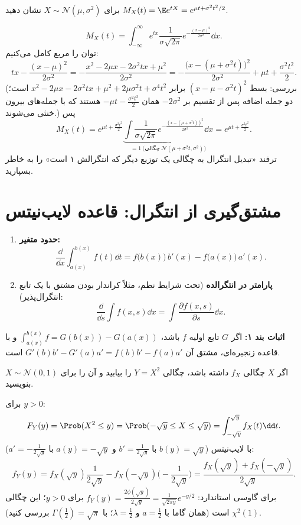 \begin{example}
برای $X\sim\mathcal N(\mu,\sigma^2)$ نشان دهید $M_X(t)=\E e^{tX}=e^{\mu t+\sigma^2t^2/2}$.
\begin{solution}
\[
M_X(t)=\int_{-\infty}^\infty e^{tx}\frac{1}{\sigma\sqrt{2\pi}}e^{-\frac{(x-\mu)^2}{2\sigma^2}}\dd x .
\]
توان را مربع کامل می‌کنیم:
\[
tx-\frac{(x-\mu)^2}{2\sigma^2}=-\frac{x^2-2\mu x-2\sigma^2tx+\mu^2}{2\sigma^2}=-\frac{\big(x-(\mu+\sigma^2t)\big)^2}{2\sigma^2}+\mu t+\frac{\sigma^2t^2}{2}.
\]
(بررسی: بسط $(x-\mu-\sigma^2t)^2$ برابر $x^2-2\mu x-2\sigma^2tx+\mu^2+2\mu\sigma^2t+\sigma^4t^2$ است؛ دو جمله اضافه پس از تقسیم بر $-2\sigma^2$ همان $-\mu t-\frac{\sigma^2t^2}{2}$ هستند که با جمله‌های بیرون خنثی می‌شوند.) پس
\[
M_X(t)=e^{\mu t+\frac{\sigma^2t^2}{2}}\underbrace{\int\frac{1}{\sigma\sqrt{2\pi}}e^{-\frac{(x-(\mu+\sigma^2t))^2}{2\sigma^2}}\dd x}_{=1\ \text{(چگالی}\ \mathcal N(\mu+\sigma^2t,\sigma^2))}=e^{\mu t+\frac{\sigma^2t^2}{2}} .
\]
ترفند «تبدیل انتگرال به چگالی یک توزیع دیگر که انتگرالش ۱ است» را به خاطر بسپارید.
\end{solution}
\end{example}

\section{مشتق‌گیری از انتگرال: قاعده لایب‌نیتس}

\begin{theorem}
\begin{enumerate}
\item \textbf{حدود متغیر:}
\[
\frac{\dd}{\dd x}\int_{a(x)}^{b(x)}f(t)\dd t=f\big(b(x)\big)\,b'(x)-f\big(a(x)\big)\,a'(x).
\]
\item \textbf{پارامتر در انتگرالده} (تحت شرایط نظم، مثلاً کراندار بودن مشتق با یک تابع انتگرال‌پذیر):
\[
\frac{\dd}{\dd s}\int f(x,s)\dd x=\int\frac{\partial f(x,s)}{\partial s}\dd x .
\]
\end{enumerate}
\end{theorem}
\textbf{اثبات بند ۱:} اگر $G$ تابع اولیه $f$ باشد، $\int_{a(x)}^{b(x)}f=G(b(x))-G(a(x))$ و با قاعده زنجیره‌ای، مشتق آن $G'(b)b'-G'(a)a'=f(b)b'-f(a)a'$ است.

\begin{example}[چگالی $Y=X^2$ و توزیع $\chi^2$ با یک درجه آزادی]
اگر $X$ چگالی $f_X$ داشته باشد، چگالی $Y=X^2$ را بیابید و آن را برای $X\sim\mathcal N(0,1)$ بنویسید.
\begin{solution}
برای $y>0$:
\[
F_Y(y)=\Prob(X^2\le y)=\Prob(-\sqrt y\le X\le\sqrt y)=\int_{-\sqrt y}^{\sqrt y}f_X(t)\dd t .
\]
با لایب‌نیتس ($b(y)=\sqrt y$ با $b'=\frac{1}{2\sqrt y}$ و $a(y)=-\sqrt y$ با $a'=-\frac{1}{2\sqrt y}$):
\[
f_Y(y)=f_X(\sqrt y)\frac{1}{2\sqrt y}-f_X(-\sqrt y)\Big(-\frac{1}{2\sqrt y}\Big)=\frac{f_X(\sqrt y)+f_X(-\sqrt y)}{2\sqrt y}.
\]
برای گاوسی استاندارد: $f_Y(y)=\frac{2\phi(\sqrt y)}{2\sqrt y}=\frac{1}{\sqrt{2\pi y}}e^{-y/2}$ برای $y>0$؛ این چگالی $\chi^2(1)$ است (همان گاما با $a=\frac12$ و $\lambda=\frac12$؛ با $\Gamma(\frac12)=\sqrt\pi$ بررسی کنید).
\end{solution}
\end{example}

